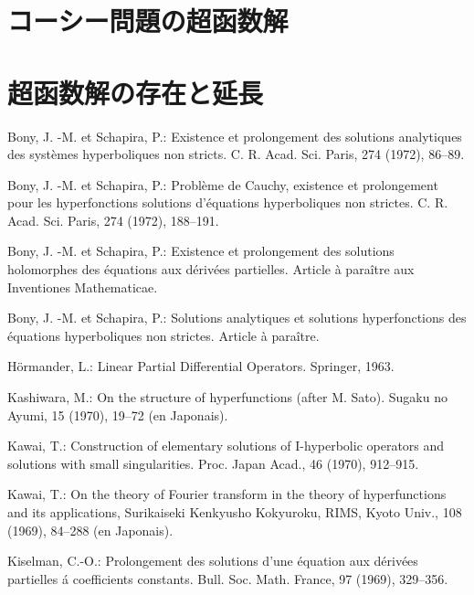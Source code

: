 \section{コーシー問題の超函数解}

\section{超函数解の存在と延長}

\begin{thebibliography}{20} 
     Bony, J. -M. et Schapira, P.: 
    Existence et prolongement des solutions analytiques 
    des systèmes hyperboliques non stricts. 
    C. R. Acad. Sci. Paris, 274 (1972), 86--89.

     Bony, J. -M. et Schapira, P.: 
    Problème de Cauchy, existence et prolongement 
    pour les hyperfonctions solutions d'équations hyperboliques 
    non strictes. C. R. Acad. Sci. Paris, 274 (1972), 188--191.

     Bony, J. -M. et Schapira, P.: 
    Existence et prolongement des solutions holomorphes 
    des \'equations aux d\'eriv\'ees partielles. 
    Article \`a para\^itre aux Inventiones Mathematicae.
   
     Bony, J. -M. et Schapira, P.: 
    Solutions analytiques et solutions hyperfonctions 
    des \'equations hyperboliques non strictes. 
    Article \`a para\^itre.

     H\"ormander, L.: 
    Linear Partial Differential Operators. Springer, 1963.

     Kashiwara, M.: 
    On the structure of hyperfunctions (after M. Sato). 
    Sugaku no Ayumi, 15 (1970), 19--72 (en Japonais).

    Kawai, T.: 
    Construction of elementary solutions of 
    I-hyperbolic operators and solutions 
    with small singularities. 
    Proc. Japan Acad., 46 (1970), 912--915.

    Kawai, T.: 
    On the theory of Fourier transform 
    in the theory of hyperfunctions and its applications, 
    Surikaiseki Kenkyusho Kokyuroku, RIMS, 
    Kyoto Univ., 108 (1969), 84--288 (en Japonais).
    
    Kiselman, C.-O.: 
    Prolongement des solutions d’une \'equation aux d\'eriv\'ees 
    partielles \'a coefficients constants. 
    Bull. Soc. Math. France, 97 (1969), 329--356.


\end{thebibliography}
